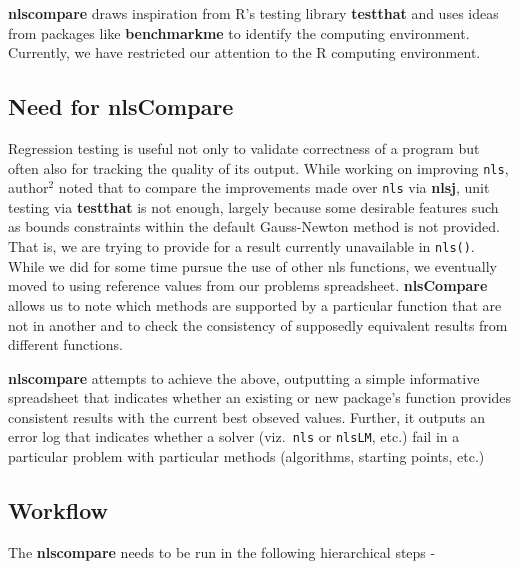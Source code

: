 \textbf{nlscompare} draws inspiration from R's testing library
\textbf{testthat} and uses ideas from packages like \textbf{benchmarkme}
to identify the computing environment. Currently, we have restricted our
attention to the R computing environment.

\hypertarget{need-for-nlscompare}{%
\subsection{Need for nlsCompare}\label{need-for-nlscompare}}

Regression testing is useful not only to validate correctness of a
program but often also for tracking the quality of its output. While
working on improving \texttt{nls}, author\(^2\) noted that to compare
the improvements made over \texttt{nls} via \textbf{nlsj}, unit testing
via \textbf{testthat} is not enough, largely because some desirable
features such as bounds constraints within the default Gauss-Newton
method is not provided. That is, we are trying to provide for a result
currently unavailable in \texttt{nls()}. While we did for some time
pursue the use of other nls functions, we eventually moved to using
reference values from our problems spreadsheet. \textbf{nlsCompare}
allows us to note which methods are supported by a particular function
that are not in another and to check the consistency of supposedly
equivalent results from different functions.

\textbf{nlscompare} attempts to achieve the above, outputting a simple
informative spreadsheet that indicates whether an existing or new
package's function provides consistent results with the current best
obseved values. Further, it outputs an error log that indicates whether
a solver (viz.~\texttt{nls} or \texttt{nlsLM}, etc.) fail in a
particular problem with particular methods (algorithms, starting points,
etc.)

\hypertarget{workflow}{%
\subsection{Workflow}\label{workflow}}

The \textbf{nlscompare} needs to be run in the following hierarchical
steps -

